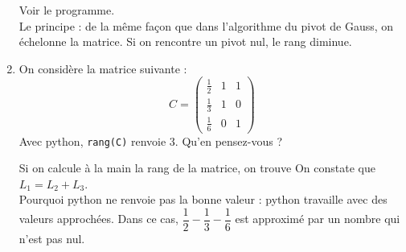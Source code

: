 \documentclass[a4paper,12pt]{article}
\begin{document}
\begin{enumerate}
\begin{solution}
Voir le programme.\\
Le principe : de la même fa\c con que dans l'algorithme du pivot de Gauss, on échelonne la matrice. Si on rencontre un pivot nul, le rang diminue.
\end{solution}
\item On considère la matrice suivante :
\[C=\begin{pmatrix}
\frac{1}{2}&1&1\\[0.2cm]
\frac{1}{3}&1&0\\[0.2cm]
\frac{1}{6}&0&1
\end{pmatrix}\]
Avec python, \verb?rang(C)? renvoie 3. Qu'en pensez-vous ?
\begin{solution}
Si on calcule à la main la rang de la matrice, on trouve  On constate que $L_1=L_2+L_3$.\\
Pourquoi python ne renvoie pas la bonne valeur : python travaille avec des valeurs approchées. Dans ce cas, $\dfrac{1}{2}-\dfrac{1}{3}-\dfrac{1}{6}$ est approximé par un nombre qui n'est pas nul. 
\end{solution}
\end{enumerate}
\end{document}
